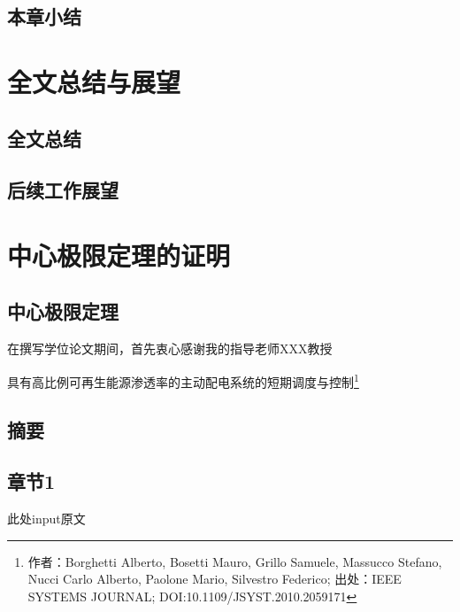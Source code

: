 \documentclass[bachelor]{NCEPU-thesis}
\begin{document}
\section{本章小结}

\blindtext

\chapter*{全文总结与展望}

\section*{全文总结}

\section*{后续工作展望}







\nocite{*}


\thesisappendix

\chapter{中心极限定理的证明}

\section{中心极限定理}

\thesisacknowledgement
在撰写学位论文期间，首先衷心感谢我的指导老师XXX教授





\thesistranslationchinese
\begin{center}
\LARGE 具有高比例可再生能源渗透率的主动配电系统的短期调度与控制\footnote{作者：Borghetti Alberto, Bosetti Mauro, Grillo Samuele, Massucco Stefano, Nucci Carlo Alberto, Paolone Mario, Silvestro Federico; 出处：IEEE SYSTEMS JOURNAL; DOI:10.1109/JSYST.2010.2059171}

\end{center}

\section{摘要}

\section{章节1}



\thesistranslationoriginal

此处input原文


\cleardoublepage
\end{document}
